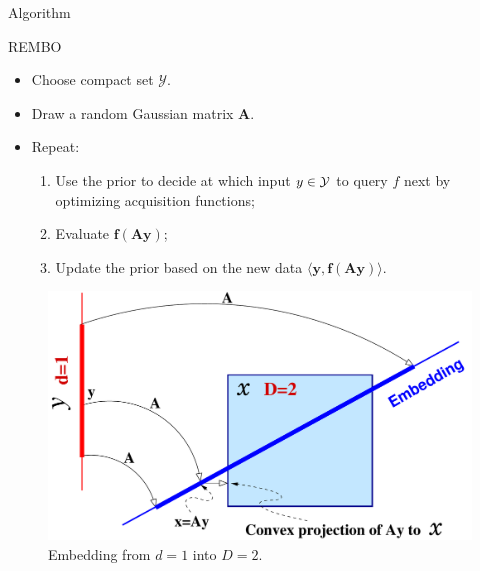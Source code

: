 \documentclass[final]{beamer}
\begin{document}
\begin{frame}[t]
\begin{columns}[T]
\begin{column}{.48\textwidth}
\begin{block}{Algorithm}
   
  \begin{block}{REMBO}
    \begin{itemize}
   \item Choose compact set {\bf \textcolor{myColor}{$\mathbf{\mathcal{Y}}$}}.
   \item Draw a random Gaussian matrix \textcolor{myColor}{$\mathbf{A}$}.
   \item Repeat:
   \begin{enumerate}
    \item Use the prior to decide at which input $y \in \cal Y$ to query $f$ next
    by optimizing acquisition functions;
    \item Evaluate {\bf \textcolor{myColor}{$\mathbf{f(Ay)}$}};
    \item Update the prior based on the new data 
    {\bf \textcolor{myColor}{$\mathbf{\langle{}y, f(Ay)\rangle}$}}.
   \end{enumerate}
  \end{itemize}
  \end{block}
  
  \begin{figure}[t!]
\centering
  \includegraphics[scale=0.6]{../paper/figures/projection.pdf}
  \caption{Embedding from $d=1$ into $D=2$. 
  }
  \label{fig:proj}
  \vspace{-1em}
\end{figure}

\end{block}








\end{column}
\end{columns}
\end{frame}
\end{document}
